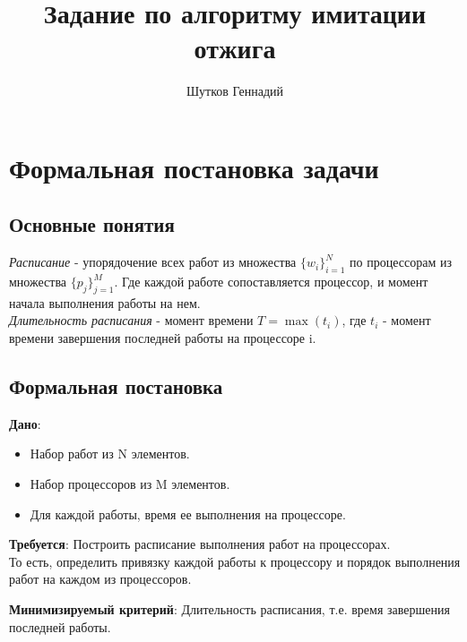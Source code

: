 \documentclass{article}
\title{Задание по алгоритму имитации отжига}
\author{Шутков Геннадий}
\begin{document}
\maketitle

\section{Формальная постановка задачи}

\subsection{Основные понятия}

\emph{Расписание} - упорядочение всех работ из множества $\{w_i\}_{i=1}^{N}$ по процессорам из множества $\{p_j\}_{j=1}^{M}$. Где каждой работе сопоставляется процессор, и момент начала выполнения работы на нем.
\\
\emph{Длительность расписания} - момент времени $T = \max(t_i)$, где $t_i$ - момент времени завершения последней работы на процессоре i.

\subsection{Формальная постановка}


\textbf{Дано}: 

\begin{itemize}
    \item Набор работ из N элементов.
    \item Набор процессоров из M элементов.
    \item Для каждой работы, время ее выполнения на процессоре.
\end{itemize}

\vspace{0.5cm}

\textbf{Требуется}: Построить расписание выполнения работ на процессорах.\\
То есть, определить привязку каждой работы к процессору и порядок выполнения работ на каждом из процессоров.

\vspace{0.5cm}

\textbf{Минимизируемый критерий}: Длительность расписания, т.е. время завершения последней работы.
\end{document}
